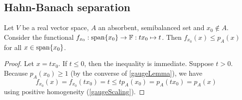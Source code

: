 \subsection{Hahn-Banach separation}

\begin{lemma} \label{gaugeSeparationLemma}
Let $V$ be a real vector space, $A$ an absorbent, semibalanced set and $x_0 \notin A$. Consider the functional $f_{x_0}: \operatorname{span}\{x_0\}\to \mathbb{F}: tx_0 \mapsto t$. Then $f_{x_0}(x)\leq p_A(x)$ for all $x\in \operatorname{span}\{x_0\}$.
\end{lemma}
\begin{proof}
Let $x = tx_0$. If $t\leq 0$, then the inequality is immediate. Suppose $t>0$. Because $p_A(x_0) \geq 1$ (by the converse of \ref{gaugeLemma}), we have
\[ f_{x_0}(x) = f_{x_0}(tx_0) = t \leq tp_A(x_0) = p_A(tx_0) = p_A(x)  \]
using positive homogeneity (\ref{gaugeScaling}).
\end{proof}

